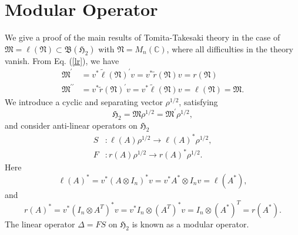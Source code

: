 \documentclass{article}
\begin{document}
\section{Modular Operator}
We give a proof  of the main results of Tomita-Takesaki theory in the case of 
$\mathfrak{M}=\ell(\mathfrak{N}) \subset \mathfrak{B}(\mathfrak{H}_2)$ with $\mathfrak{N}=M_n(\mathbb{C})$,
where all difficulties in the theory vanish.
From Eq. (\ref{lr}),
we have
\begin{equation}
\begin{split}
\mathfrak{M}^\prime&=v^\ast \tilde{\ell}(\mathfrak{N})^\prime v= v^\ast \tilde{r}(\mathfrak{N})v=r(\mathfrak{N}) \\
\mathfrak{M}^{\prime\prime}&=v^\ast \tilde{r}(\mathfrak{N})^\prime v= v^\ast \tilde{\ell}(\mathfrak{N})v=\ell(\mathfrak{N})=\mathfrak{M}.
\end{split}
\end{equation}
We introduce  a cyclic and separating vector $\rho^{1/2}$, satisfying 
$$
\mathfrak{H}_2=\mathfrak{M}\rho^{1/2}=\mathfrak{M}^\prime \rho^{1/2},
$$
and consider  anti-linear operators on $\mathfrak{H}_2$ 
\begin{equation}\label{SF}
	 \begin{split}
		 S&:\ell(A) \rho^{1/2} \to \ell(A)^\ast\rho^{1/2},\\
		 F&:r(A) \rho^{1/2} \to r(A)^\ast\rho^{1/2}.
	 \end{split}
\end{equation}
	Here 
	$$
	\ell(A)^\ast=v^\ast(A\otimes I_n)^\ast v=v^\ast A^\ast \otimes I_n v=\ell(A^\ast),
	$$
	and
	$$
  r(A)^\ast=v^\ast (I_n\otimes A^T)^\ast v=v^\ast I_n\otimes (A^T)^\ast v=I_n\otimes (A^\ast)^T=r(A^\ast).
	$$
	The linear operator $\Delta=FS$ on $\mathfrak{H}_2$ is known as a modular operator.
\end{document}
